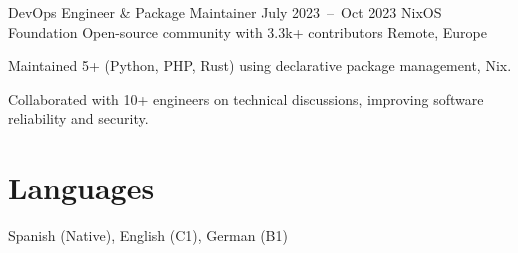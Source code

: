 \documentclass[a4paper]{article}
\begin{document}

\begin{cvitemizeentry}%
  {DevOps Engineer \& Package Maintainer}
  {July 2023~--~Oct 2023}
  {NixOS Foundation}
  {Open-source community with 3.3k+ contributors}
  {Remote, Europe}
  \item Maintained 5+  (Python, PHP, Rust) using declarative package management, Nix.
  \item Collaborated with 10+ engineers on technical discussions, improving software reliability and security.
\end{cvitemizeentry}


\section{Languages}

Spanish (Native), English (C1), German (B1)

\end{document}
